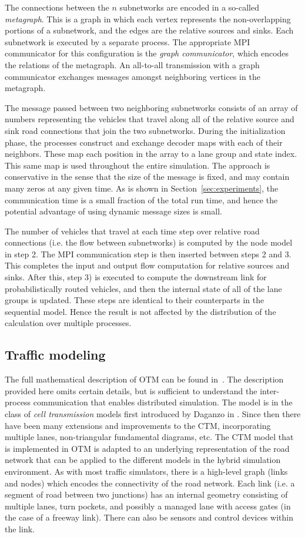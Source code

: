 The connections between the $n$ subnetworks are encoded in a so-called \textit{metagraph}. This is a graph in which each vertex represents the non-overlapping portions of a subnetwork, and the edges are the relative sources and sinks. Each subnetwork is executed by a separate process. The appropriate MPI communicator for this configuration is the \textit{graph communicator}, which encodes the relations of the metagraph. An all-to-all transmission with a graph communicator exchanges messages amongst neighboring vertices in the metagraph. 

The message passed between two neighboring subnetworks consists of an array of numbers representing the vehicles that travel along all of the relative source and sink road connections that join the two subnetworks. During the initialization phase, the processes construct and exchange decoder maps with each of their neighbors. These map each position in the array to a lane group and state index. This same map is used throughout the entire simulation. The approach is conservative in the sense that the size of the message is fixed, and may contain many zeros at any given time. As is shown in Section~\ref{sec:experiments}, the communication time is a small fraction of the total run time, and hence the potential advantage of using dynamic message sizes is small.

The number of vehicles that travel at each time step over relative road connections (i.e. the flow between subnetworks) is computed by the node model in step 2. The MPI communication step is then inserted between steps 2 and 3. This completes the input and output flow computation for relative sources and sinks. After this, step 3) is executed to compute the downstream link for probabilistically routed vehicles, and then the internal state of all of the lane groups is updated. These steps are identical to their counterparts in the sequential model. Hence the result is not affected by the distribution of the calculation over multiple processes.


\subsection{Traffic modeling}
The full mathematical description of OTM can be found in~\cite{Gomes2019OTM}.
The description provided here omits certain details, but is sufficient to understand the inter-process communication that enables distributed simulation. The model is in the class of \textit{cell transmission} models first introduced by Daganzo in \cite{DaganzoCTM}. Since then there have been many extensions and improvements to the CTM, incorporating multiple lanes, non-triangular fundamental diagrams, etc. The CTM model that is implemented in OTM is adapted to an underlying representation of the road network that can be applied to the different  models in the hybrid simulation environment. As with most traffic simulators, there is a high-level graph (links and nodes) which encodes the connectivity of the road network. Each link (i.e. a segment of road between two junctions) has an internal geometry consisting of multiple lanes, turn pockets, and possibly a managed lane with access gates (in the case of a freeway link). There can also be sensors and control devices within the link. 

